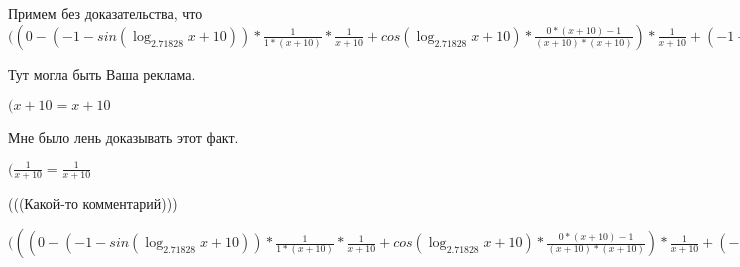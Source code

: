 \documentclass[12pt,a4paper,fleqn]{article}
\theoremstyle{definition}
\begin{document}
Примем без доказательства, что
$(( 0  - ( -1  - sin(\log_{ 2.71828 }{ x  +  10 })) * \frac{ 1 }{ 1  * ( x  +  10 )}
 * \frac{ 1 }{ x  +  10 }
 + cos(\log_{ 2.71828 }{ x  +  10 }) * \frac{ 0  * ( x  +  10 ) -  1 }{( x  +  10 ) * ( x  +  10 )}
) * \frac{ 1 }{ x  +  10 }
 + ( -1  - cos(\log_{ 2.71828 }{ x  +  10 }) * \frac{ 1 }{ x  +  10 }
) * \frac{ 0  * ( x  +  10 ) -  1 }{( x  +  10 ) * ( x  +  10 )}
 + ( 0  - cos(\log_{ 2.71828 }{ x  +  10 }) * \frac{ 1 }{ 1  * ( x  +  10 )}
) * \frac{ -2 }{( x  +  10 ) * ( x  +  10 )}
 + ( -1  - sin(\log_{ 2.71828 }{ x  +  10 })) * \frac{ 0  * ( x  +  10 ) * ( x  +  10 ) -  -2  * ( 1  * ( x  +  10 ) + ( x  +  10 ) *  1 )}{( x  +  10 ) * ( x  +  10 ) * ( x  +  10 ) * ( x  +  10 )}
 = ( 0  - ( -1  - sin(\log_{ 2.71828 }{ x  +  10 })) * \frac{ 1 }{ 1  * ( x  +  10 )}
 * \frac{ 1 }{ x  +  10 }
 + cos(\log_{ 2.71828 }{ x  +  10 }) * \frac{ 0  * ( x  +  10 ) -  1 }{( x  +  10 ) * ( x  +  10 )}
) * \frac{ 1 }{ x  +  10 }
 + ( -1  - cos(\log_{ 2.71828 }{ x  +  10 }) * \frac{ 1 }{ x  +  10 }
) * \frac{ 0  * ( x  +  10 ) -  1 }{( x  +  10 ) * ( x  +  10 )}
 + ( 0  - cos(\log_{ 2.71828 }{ x  +  10 }) * \frac{ 1 }{ 1  * ( x  +  10 )}
) * \frac{ -2 }{( x  +  10 ) * ( x  +  10 )}
 + ( -1  - sin(\log_{ 2.71828 }{ x  +  10 })) * \frac{ 0  * ( x  +  10 ) * ( x  +  10 ) -  -2  * ( 1  * ( x  +  10 ) + ( x  +  10 ) *  1 )}{( x  +  10 ) * ( x  +  10 ) * ( x  +  10 ) * ( x  +  10 )}
$

Тут могла быть Ваша реклама.

$( x  +  10  =  x  +  10 $

Мне было лень доказывать этот факт.

$(\frac{ 1 }{ x  +  10 }
 = \frac{ 1 }{ x  +  10 }
$

(((Какой-то комментарий)))

$((( 0  - ( -1  - sin(\log_{ 2.71828 }{ x  +  10 })) * \frac{ 1 }{ 1  * ( x  +  10 )}
 * \frac{ 1 }{ x  +  10 }
 + cos(\log_{ 2.71828 }{ x  +  10 }) * \frac{ 0  * ( x  +  10 ) -  1 }{( x  +  10 ) * ( x  +  10 )}
) * \frac{ 1 }{ x  +  10 }
 + ( -1  - cos(\log_{ 2.71828 }{ x  +  10 }) * \frac{ 1 }{ x  +  10 }
) * \frac{ 0  * ( x  +  10 ) -  1 }{( x  +  10 ) * ( x  +  10 )}
 + ( 0  - cos(\log_{ 2.71828 }{ x  +  10 }) * \frac{ 1 }{ 1  * ( x  +  10 )}
) * \frac{ -2 }{( x  +  10 ) * ( x  +  10 )}
 + ( -1  - sin(\log_{ 2.71828 }{ x  +  10 })) * \frac{ 0  * ( x  +  10 ) * ( x  +  10 ) -  -2  * ( 1  * ( x  +  10 ) + ( x  +  10 ) *  1 )}{( x  +  10 ) * ( x  +  10 ) * ( x  +  10 ) * ( x  +  10 )}
) * \frac{ 1 }{ x  +  10 }
 = (( 0  - ( -1  - sin(\log_{ 2.71828 }{ x  +  10 })) * \frac{ 1 }{ 1  * ( x  +  10 )}
 * \frac{ 1 }{ x  +  10 }
 + cos(\log_{ 2.71828 }{ x  +  10 }) * \frac{ 0  * ( x  +  10 ) -  1 }{( x  +  10 ) * ( x  +  10 )}
) * \frac{ 1 }{ x  +  10 }
 + ( -1  - cos(\log_{ 2.71828 }{ x  +  10 }) * \frac{ 1 }{ x  +  10 }
) * \frac{ 0  * ( x  +  10 ) -  1 }{( x  +  10 ) * ( x  +  10 )}
 + ( 0  - cos(\log_{ 2.71828 }{ x  +  10 }) * \frac{ 1 }{ 1  * ( x  +  10 )}
) * \frac{ -2 }{( x  +  10 ) * ( x  +  10 )}
 + ( -1  - sin(\log_{ 2.71828 }{ x  +  10 })) * \frac{ 0  * ( x  +  10 ) * ( x  +  10 ) -  -2  * ( 1  * ( x  +  10 ) + ( x  +  10 ) *  1 )}{( x  +  10 ) * ( x  +  10 ) * ( x  +  10 ) * ( x  +  10 )}
) * \frac{ 1 }{ x  +  10 }
$
\end{document}
